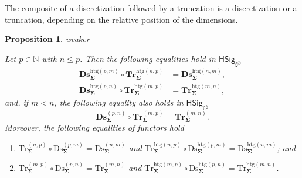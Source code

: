 \documentclass[a4paper, reqno]{amsbook}
\makeatletter
\newcommand{\sig}[1]{\mathbf{#1}}             %
\newcommand{\gd}{\mathfrak{gd}}              %
\newcommand{\htg}{\mathrm{htg}}                %
\newcommand{\Ds}{\mathrm{Ds}}
\newcommand{\Tr}{\mathrm{Tr}}
\newcommand{\bDs}{\mathbf{Ds}}
\newcommand{\bTr}{\mathbf{Tr}}
\theoremstyle{plain}
\newtheorem{proposition}[theorem]{Proposition}
\theoremstyle{definition}
\newcommand*{\CA@leanpending}{}
\newcommand*{\CA@leanrelation}{}
\newcommand*{\lean}[2]{%
  \ifcsname\string\color@lean@#1\endcsname\else
    \PackageError{main}{Unknown relation `#1' in \string\lean}{Use equivalent, weaker or stronger.}%
  \fi
  \gdef\CA@leanrelation{#1}%
  \gdef\CA@leanpending{#2}}
\makeatother
\begin{document}
The composite of a discretization followed by a truncation is a discretization or a truncation, depending on the relative position of the dimensions.

\begin{proposition}\label{PTrDsComp}\lean{weaker}{Dimensions.heterogeneousMixed_upper,Dimensions.heterogeneousMixed_lower,Dimensions.homogeneousMixed_lower,Dimensions.homogeneousMixedUpperFunctor,Dimensions.heterogeneousMixedUpperFunctor,Dimensions.homogeneousMixedLowerFunctor,Dimensions.heterogeneousMixedLowerFunctor}
Let $p\in\mathbb{N}$ with $n\leq p$.
Then the following equalities hold in $\mathsf{HSig}_{\gd}$
\begin{align*}
\bDs^{\htg(p,m)}_{\sig{\Sigma}}\circ\bTr^{\htg(n,p)}_{\sig{\Sigma}}&=\bDs^{\htg(n,m)}_{\sig{\Sigma}},\\
\bDs^{\htg(p,n)}_{\sig{\Sigma}}\circ\bTr^{\htg(m,p)}_{\sig{\Sigma}}&=\bTr^{\htg(m,n)}_{\sig{\Sigma}},
\end{align*}
and, if $m<n$, the following equality also holds in $\mathsf{HSig}_{\gd}$
$$
\bDs^{(p,n)}_{\sig{\Sigma}}\circ\bTr^{(m,p)}_{\sig{\Sigma}}=\bTr^{(m,n)}_{\sig{\Sigma}}.
$$
Moreover, the following equalities of functors hold
\begin{enumerate}
	\item
	$\Tr^{(n,p)}_{\sig{\Sigma}}\circ\Ds^{(p,m)}_{\sig{\Sigma}}=\Ds^{(n,m)}_{\sig{\Sigma}}$ and $\Tr^{\htg(n,p)}_{\sig{\Sigma}}\circ\Ds^{\htg(p,m)}_{\sig{\Sigma}}=\Ds^{\htg(n,m)}_{\sig{\Sigma}}$; and

	\item
	$\Tr^{(m,p)}_{\sig{\Sigma}}\circ\Ds^{(p,n)}_{\sig{\Sigma}}=\Tr^{(m,n)}_{\sig{\Sigma}}$ and $\Tr^{\htg(m,p)}_{\sig{\Sigma}}\circ\Ds^{\htg(p,n)}_{\sig{\Sigma}}=\Tr^{\htg(m,n)}_{\sig{\Sigma}}$.
\end{enumerate}
\end{proposition}
\end{document}
